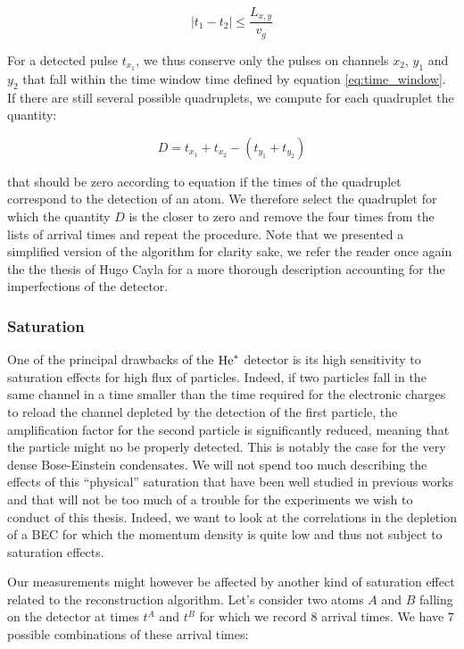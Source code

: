 \begin{equation}
    |t_1-t_2| \leq \frac{L_{x,y}}{v_g}
    \label{eq:time_window}
\end{equation}

\noindent For a detected pulse $t_{x_1}$, we thus conserve only the pulses on channels $x_2$, $y_1$ and $y_2$ that fall within the time window time defined by equation \ref{eq:time_window}. If there are still several possible quadruplets, we compute for each quadruplet the quantity:

\begin{equation}
    D = t_{x_1}+t_{x_2} - (t_{y_1}+t_{y_2})
\end{equation}

\noindent that should be zero according to equation \label{eq:tdet_MCP} if the times of the quadruplet correspond to the detection of an atom. We therefore select the quadruplet for which the quantity $D$ is the closer to zero and remove the four times from the lists of arrival times and repeat the procedure. Note that we presented a simplified version of the algorithm for clarity sake, we refer the reader once again the the thesis of Hugo Cayla \cite{cayla_these} for a more thorough description accounting for the imperfections of the detector.

\subsubsection{Saturation}

One of the principal drawbacks of the $\mathrm{He}^*$ detector is its high sensitivity to saturation effects for high flux of particles. Indeed, if two particles fall in the same channel in a time smaller than the time required for the electronic charges to reload the channel depleted by the detection of the first particle, the amplification factor for the second particle is significantly reduced, meaning that the particle might no be properly detected. This is notably the case for the very dense Bose-Einstein condensates. We will not spend too much describing the effects of this ``physical'' saturation that have been well studied in previous works \cite{carcy_these,cayla_these,edgar1992spatial,nogrette2015characterization} and that will not be too much of a trouble for the experiments we wish to conduct of this thesis. Indeed, we want to look at the correlations in the depletion of a BEC for which the momentum density is quite low and thus not subject to saturation effects.

Our measurements might however be affected by another kind of saturation effect related to the reconstruction algorithm. Let's consider two atoms $A$ and $B$ falling on the detector at times $t^A$ and $t^B$ for which we record 8 arrival times. We have 7 possible combinations of these arrival times:

